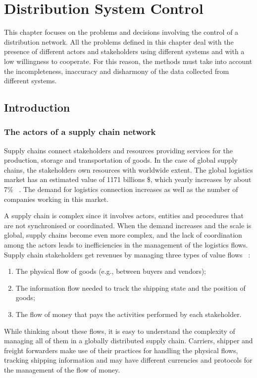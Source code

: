 \chapter{Distribution System Control}{} \label{chapDistControl}
This chapter focuses on the problems and decisions involving the control of a distribution network. All the problems defined in this chapter deal with the presence of different actors and stakeholders using different systems and with a low willingness to cooperate. For this reason, the methods must take into account the incompleteness, inaccuracy and disharmony of the data collected from different systems.

\section{Introduction}
\subsection{The actors of a supply chain network}
Supply chains connect stakeholders and resources providing services for the production, storage and transportation of goods. In the case of global supply chains, the stakeholders own resources with worldwide extent. The global logistics market has an estimated value of 1171 billions \$, which yearly increases by about 7\% ~\cite{Researchandmarkets2018}. The demand for logistics connection increases as well as the number of companies working in this market. \par

A supply chain is complex since it involves actors, entities and procedures that are not synchronised or coordinated. When the demand increases and the scale is global, supply chains become even more complex, and the lack of coordination among the actors leads to inefficiencies in the management of the logistics flows. Supply chain stakeholders get revenues by managing three types of value flows ~\cite{Li2019}:

\begin{enumerate}
    \item The physical flow of goods (e.g., between buyers and vendors);
    \item The information flow needed to track the shipping state and the position of goods;
    \item The flow of money that pays the activities performed by each stakeholder.
\end{enumerate}

While thinking about these flows, it is easy to understand the complexity of managing all of them in a globally distributed supply chain. Carriers, shipper and freight forwarders make use of their practices for handling the physical flows, tracking shipping information and may have different currencies and protocols for the management of the flow of money.\par

